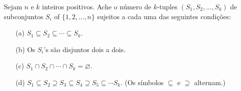 Sejam $n$ e $k$ inteiros positivos. Ache o número de $k$-tuples $(S_1, S_2, \dots, S_k)$ de subconjuntos $S_i$ of $\{1, 2, \dots , n\}$ sujeitos a cada uma das seguintes condições:

\begin{enumerate}
	\item[(a)] $S_1 \subseteq S_2 \subseteq \cdots \subseteq S_k$.
	\item[(b)] Os $S_i$'s são disjuntos dois a dois.
	\item[(c)] $S_1 \cap S_2 \cap \cdots \cap S_k = \varnothing$.
	\item[(d)] $S_1 \subseteq S_2 \supseteq S_3 \subseteq S_4 \supseteq S_5 \subseteq \cdots S_k$. (Os símbolos $\subseteq$ e $\supseteq$ alternam.)
\end{enumerate}
